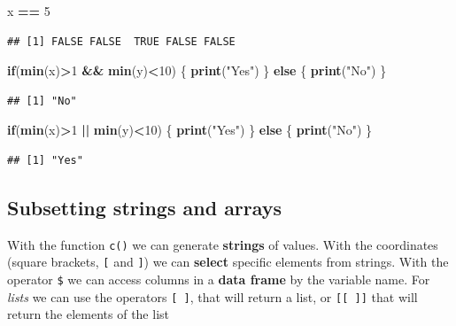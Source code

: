 \documentclass[
]{article}
\newenvironment{Shaded}{\begin{snugshade}}{\end{snugshade}}
\newcommand{\ControlFlowTok}[1]{\textcolor[rgb]{0.13,0.29,0.53}{\textbf{#1}}}
\newcommand{\DecValTok}[1]{\textcolor[rgb]{0.00,0.00,0.81}{#1}}
\newcommand{\KeywordTok}[1]{\textcolor[rgb]{0.13,0.29,0.53}{\textbf{#1}}}
\newcommand{\NormalTok}[1]{#1}
\newcommand{\OperatorTok}[1]{\textcolor[rgb]{0.81,0.36,0.00}{\textbf{#1}}}
\newcommand{\StringTok}[1]{\textcolor[rgb]{0.31,0.60,0.02}{#1}}
\begin{document}
\begin{Shaded}
\begin{Highlighting}[]
\NormalTok{x }\OperatorTok{==}\StringTok{ }\DecValTok{5}
\end{Highlighting}
\end{Shaded}

\begin{verbatim}
## [1] FALSE FALSE  TRUE FALSE FALSE
\end{verbatim}

\begin{Shaded}
\begin{Highlighting}[]
\ControlFlowTok{if}\NormalTok{(}\KeywordTok{min}\NormalTok{(x)}\OperatorTok{>}\DecValTok{1} \OperatorTok{&&}\StringTok{ }\KeywordTok{min}\NormalTok{(y)}\OperatorTok{<}\DecValTok{10}\NormalTok{) \{}
  \KeywordTok{print}\NormalTok{(}\StringTok{"Yes"}\NormalTok{)}
\NormalTok{\} }\ControlFlowTok{else}\NormalTok{ \{}
  \KeywordTok{print}\NormalTok{(}\StringTok{"No"}\NormalTok{)}
\NormalTok{\}}
\end{Highlighting}
\end{Shaded}

\begin{verbatim}
## [1] "No"
\end{verbatim}

\begin{Shaded}
\begin{Highlighting}[]
\ControlFlowTok{if}\NormalTok{(}\KeywordTok{min}\NormalTok{(x)}\OperatorTok{>}\DecValTok{1} \OperatorTok{||}\StringTok{ }\KeywordTok{min}\NormalTok{(y)}\OperatorTok{<}\DecValTok{10}\NormalTok{) \{}
  \KeywordTok{print}\NormalTok{(}\StringTok{"Yes"}\NormalTok{)}
\NormalTok{\} }\ControlFlowTok{else}\NormalTok{ \{}
  \KeywordTok{print}\NormalTok{(}\StringTok{"No"}\NormalTok{)}
\NormalTok{\}}
\end{Highlighting}
\end{Shaded}

\begin{verbatim}
## [1] "Yes"
\end{verbatim}

\hypertarget{subsetting-strings-and-arrays}{%
\subsection{Subsetting strings and
arrays}\label{subsetting-strings-and-arrays}}

With the function \texttt{c()} we can generate \textbf{strings} of
values. With the coordinates (square brackets, \texttt{{[}} and
\texttt{{]}}) we can \textbf{select} specific elements from strings.
With the operator \texttt{\$} we can access columns in a \textbf{data
frame} by the variable name. For \emph{lists} we can use the operators
\texttt{{[}\ {]}}, that will return a list, or \texttt{{[}{[}\ {]}{]}}
that will return the elements of the list
\end{document}
